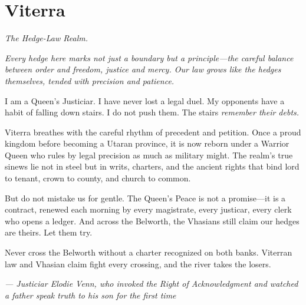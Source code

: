 \newpage

\newpage

\chapter{Viterra}
\emph{The Hedge-Law Realm.}

\noindent
{\Large
\textit{Every hedge here marks not just a boundary but a principle---the careful balance between order and freedom, justice and mercy. Our law grows like the hedges themselves, tended with precision and patience.}

\vspace{0.5em}

I am a Queen's Justiciar. I have never lost a legal duel. My opponents have a habit of falling down stairs. I do not push them. The stairs \textit{remember their debts.}

\vspace{0.5em}

Viterra breathes with the careful rhythm of precedent and petition. Once a proud kingdom before becoming a Utaran province, it is now reborn under a Warrior Queen who rules by legal precision as much as military might. The realm's true sinews lie not in steel but in writs, charters, and the ancient rights that bind lord to tenant, crown to county, and church to common.

\vspace{0.5em}

But do not mistake us for gentle. The Queen's Peace is not a promise---it is a contract, renewed each morning by every magistrate, every justicar, every clerk who opens a ledger. And across the Belworth, the Vhasians still claim our hedges are theirs. Let them try.

\vspace{0.5em}

Never cross the Belworth without a charter recognized on both banks. Viterran law and Vhasian claim fight every crossing, and the river takes the losers.

\vspace{1em}

\noindent\textit{--- Justiciar Elodie Venn, who invoked the Right of Acknowledgment and watched a father speak truth to his son for the first time}
}

\vspace{1em}

